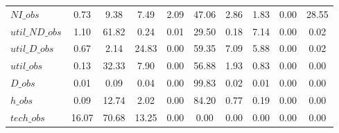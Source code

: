 \begin{center}
\begin{longtable}{lccccccccc}
$NI\_obs        $	 & 	         0.73	 & 	         9.38	 & 	         7.49	 & 	         2.09	 & 	        47.06	 & 	         2.86	 & 	         1.83	 & 	         0.00	 & 	        28.55 \\ 
$util\_ND\_obs  $	 & 	         1.10	 & 	        61.82	 & 	         0.24	 & 	         0.01	 & 	        29.50	 & 	         0.18	 & 	         7.14	 & 	         0.00	 & 	         0.02 \\ 
$util\_D\_obs   $	 & 	         0.67	 & 	         2.14	 & 	        24.83	 & 	         0.00	 & 	        59.35	 & 	         7.09	 & 	         5.88	 & 	         0.00	 & 	         0.02 \\ 
$util\_obs      $	 & 	         0.13	 & 	        32.33	 & 	         7.90	 & 	         0.00	 & 	        56.88	 & 	         1.93	 & 	         0.83	 & 	         0.00	 & 	         0.00 \\ 
$D\_obs         $	 & 	         0.01	 & 	         0.09	 & 	         0.04	 & 	         0.00	 & 	        99.83	 & 	         0.02	 & 	         0.01	 & 	         0.00	 & 	         0.00 \\ 
$h\_obs         $	 & 	         0.09	 & 	        12.74	 & 	         2.02	 & 	         0.00	 & 	        84.20	 & 	         0.77	 & 	         0.19	 & 	         0.00	 & 	         0.00 \\ 
$tech\_obs      $	 & 	        16.07	 & 	        70.68	 & 	        13.25	 & 	         0.00	 & 	         0.00	 & 	         0.00	 & 	         0.00	 & 	         0.00	 & 	         0.00 \\ 
\end{longtable}
 \end{center}
